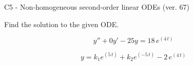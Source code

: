 \begin{exercise}
  \begin{exerciseTitle}C5 - Non-homogeneous second-order linear ODEs (ver. 67)\end{exerciseTitle}
  \begin{exerciseStatement}
    
Find the solution to the given ODE.

    
\[y''+0y'-25y = 18 \, e^{\left(4 \, t\right)}\]

  \end{exerciseStatement}
  \begin{exerciseAnswer}
    
\[y= k_{1} e^{\left(5 \, t\right)} + k_{2} e^{\left(-5 \, t\right)} - 2 \, e^{\left(4 \, t\right)}\]

  \end{exerciseAnswer}
\end{exercise}